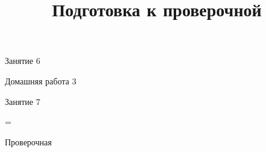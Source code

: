 \begin{class}[number=6]
	\begin{listofex}
		\item Занятие 6
	\end{listofex}
\end{class}

\begin{homework}[number=3]
	\begin{listofex}
		\item Домашняя работа 3
	\end{listofex}
\end{homework}

\begin{class}[number=7]
	\title{Подготовка к проверочной}
	\begin{listofex}
		\item Занятие 7
	\end{listofex}
\end{class}

=%
\begin{exam}
	\begin{listofex}
		\item Проверочная
	\end{listofex}
\end{exam}


